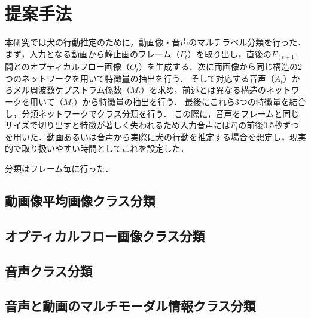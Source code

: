 \chapter{提案手法}
本研究では犬の行動推定のために，動画像・音声のマルチラベル分類を行った．
まず，入力となる動画から静止画のフレーム（$F_t$）を取り出し，直後の$F_(t+1)$間とのオプティカルフロー画像（$O_t$）を生成する．次に両画像から同じ構造の2つのネットワークを用いて特徴量の抽出を行う．
そして対応する音声（$A_t$）からメル周波数ケプストラム係数（$M_t$）を求め，前述とは異なる構造のネットワークを用いて（$M_t$）から特徴量の抽出を行う．
最後にこれら3つの特徴量を結合し，分類ネットワークでクラス分類を行う．
この際に，音声をフレームと同じサイズで切り出すと特徴が著しく失われるため入力音声には$F_t$の前後0.5秒ずつを用いた．動画あるいは音声から実際に犬の行動を推定する場合を想定し，現実的で取り扱いやすい時間としてこれを設定した．

分類はフレーム毎に行った．
\section{動画像平均画像クラス分類}
\section{オプティカルフロー画像クラス分類}
\section{音声クラス分類}
\section{音声と動画のマルチモーダル情報クラス分類}

